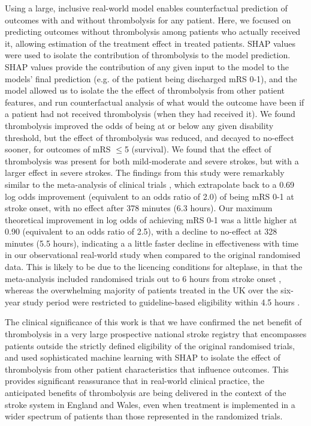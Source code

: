 Using a large, inclusive real-world model enables counterfactual prediction of outcomes with and without thrombolysis for any patient. Here, we focused on predicting outcomes without thrombolysis among patients who actually received it, allowing estimation of the treatment effect in treated patients. SHAP values were used to isolate the contribution of thrombolysis to the model prediction. SHAP values provide the contribution of any given input to the model to the models’ final prediction (e.g. of the patient being discharged mRS 0-1), and the model allowed us to isolate the the effect of thrombolysis from other patient features, and run counterfactual analysis of what would the outcome have been if a patient had not received thrombolysis (when they had received it). We found thrombolysis improved the odds of being at or below any given disability threshold, but the effect of thrombolysis was reduced, and decayed to no-effect sooner, for outcomes of mRS $\leq$5 (survival). We found that the effect of thrombolysis was present for both mild-moderate and severe strokes, but with a larger effect in severe strokes. The findings from this study were remarkably similar to the meta-analysis of clinical trials \cite{emberson_effect_2014}, which extrapolate back to a 0.69 log odds improvement (equivalent to an odds ratio of 2.0) of being mRS 0-1 at stroke onset, with no effect after 378 minutes (6.3 hours). Our maximum theoretical improvement in log odds of achieving mRS 0-1 was a little higher at 0.90 (equivalent to an odds ratio of 2.5), with a decline to no-effect at 328 minutes (5.5 hours), indicating a a little faster decline in effectiveness with time in our observational real-world study when compared to the original randomised data.  This is likely to be due to the licencing conditions for alteplase, in that the meta-analysis included randomised trials out to 6 hours from stroke onset \cite{emberson_effect_2014}, whereas the overwhelming majority of patients treated in the UK over the six-year study period were restricted to guideline-based eligibility within 4.5 hours \cite{intercollegiate_stroke_working_party_national_2016}.


The clinical significance of this work is that we have confirmed the net benefit of thrombolysis in a very large prospective national stroke registry that encompasses patients outside the strictly defined eligibility of the original randomised trials, and used sophisticated machine learning with SHAP to isolate the effect of thrombolysis from other patient characteristics that influence outcomes.  This provides significant reassurance that in real-world clinical practice, the anticipated benefits of thrombolysis are being delivered in the context of the stroke system in England and Wales, even when treatment is implemented in a wider spectrum of patients than those represented in the randomized trials. 

